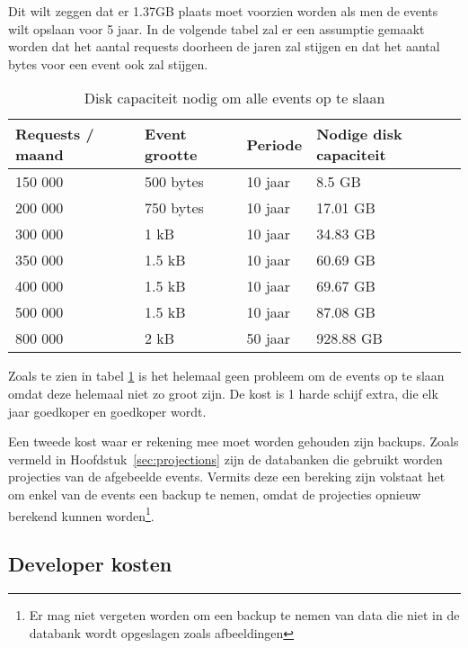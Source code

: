 Dit wilt zeggen dat er 1.37GB plaats moet voorzien worden als men de events wilt opslaan voor 5 jaar. In de volgende tabel zal er een assumptie gemaakt worden dat het aantal requests doorheen de jaren zal stijgen en dat het aantal bytes voor een event ook zal stijgen.

\begin{table}[h]
\centering
\begin{tabular}{@{}llll@{}}
\toprule
Requests / maand & Event grootte & Periode & Nodige disk capaciteit \\ \midrule
150 000 & 500 bytes & 10 jaar & 8.5 GB \\
200 000 & 750 bytes & 10 jaar & 17.01 GB \\
300 000 & 1 kB & 10 jaar & 34.83 GB \\
350 000 & 1.5 kB & 10 jaar & 60.69 GB \\
400 000 & 1.5 kB & 10 jaar & 69.67 GB \\
500 000 & 1.5 kB & 10 jaar & 87.08 GB \\ \midrule
800 000 & 2 kB & 50 jaar & 928.88 GB \\ \bottomrule
\end{tabular}
\caption[Disk capaciteit nodig om alle events op te slaan]{Disk capaciteit nodig om alle events op te slaan\footnotemark}
\label{disk-capaciteit}
\end{table}


Zoals te zien in tabel \ref{disk-capaciteit} is het helemaal geen probleem om de events op te slaan omdat deze helemaal niet zo groot zijn. De kost is 1 harde schijf extra, die elk jaar goedkoper en goedkoper wordt.

Een tweede kost waar er rekening mee moet worden gehouden zijn backups. Zoals vermeld in Hoofdstuk~\ref{sec:projections} zijn de databanken die gebruikt worden projecties van de afgebeelde events. Vermits deze een bereking zijn volstaat het om enkel van de events een backup te nemen, omdat de projecties opnieuw berekend kunnen worden\footnote{Er mag niet vergeten worden om een backup te nemen van data die niet in de databank wordt opgeslagen zoals afbeeldingen}.

\subsection{Developer kosten}
\label{subsec:developer-kosten}

